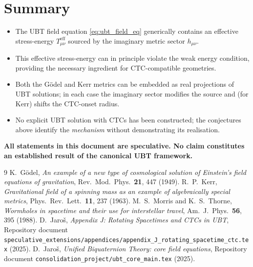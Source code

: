 \documentclass[12pt]{article}
\begin{document}
\section{Summary}
\begin{itemize}
  \item The UBT field equation \eqref{eq:ubt_field_eq} generically contains
    an effective stress-energy $T_{\mu\nu}^{\mathrm{eff}}$ sourced by the
    imaginary metric sector $h_{\mu\nu}$.
  \item This effective stress-energy can in principle violate the weak energy
    condition, providing the necessary ingredient for CTC-compatible
    geometries.
  \item Both the Gödel and Kerr metrics can be embedded as real projections
    of UBT solutions; in each case the imaginary sector modifies the
    source and (for Kerr) shifts the CTC-onset radius.
  \item No explicit UBT solution with CTCs has been constructed; the
    conjectures above identify the \emph{mechanism} without demonstrating
    its realisation.
\end{itemize}

\medskip
\noindent\textbf{All statements in this document are speculative.  No
claim constitutes an established result of the canonical UBT framework.}


\begin{thebibliography}{9}
  K.~Gödel,
  \emph{An example of a new type of cosmological solution of Einstein's
  field equations of gravitation},
  Rev.\ Mod.\ Phys.\ \textbf{21}, 447 (1949).
  R.~P.~Kerr,
  \emph{Gravitational field of a spinning mass as an example of
  algebraically special metrics},
  Phys.\ Rev.\ Lett.\ \textbf{11}, 237 (1963).
  M.~S.~Morris and K.~S.~Thorne,
  \emph{Wormholes in spacetime and their use for interstellar travel},
  Am.\ J.\ Phys.\ \textbf{56}, 395 (1988).
  D.~Jaroš,
  \emph{Appendix J: Rotating Spacetimes and CTCs in UBT},
  Repository document
  \texttt{speculative\_extensions/appendices/appendix\_J\_rotating\_spacetime\_ctc.tex}
  (2025).
  D.~Jaroš,
  \emph{Unified Biquaternion Theory: core field equations},
  Repository document \texttt{consolidation\_project/ubt\_core\_main.tex} (2025).
\end{thebibliography}
\end{document}

